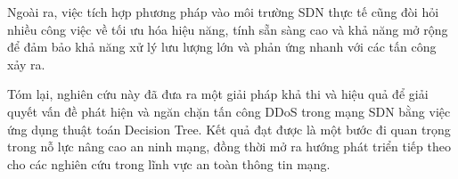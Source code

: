\documentclass[a4paper]{article}
\begin{document}
Ngoài ra, việc tích hợp phương pháp vào môi trường SDN thực tế cũng đòi hỏi nhiều công việc về tối ưu hóa hiệu năng, tính sẵn sàng cao và khả năng mở rộng để đảm bảo khả năng xử lý lưu lượng lớn và phản ứng nhanh với các tấn công xảy ra.

Tóm lại, nghiên cứu này đã đưa ra một giải pháp khả thi và hiệu quả để giải quyết vấn đề phát hiện và ngăn chặn tấn công DDoS trong mạng SDN bằng việc ứng dụng thuật toán Decision Tree. Kết quả đạt được là một bước đi quan trọng trong nỗ lực nâng cao an ninh mạng, đồng thời mở ra hướng phát triển tiếp theo cho các nghiên cứu trong lĩnh vực an toàn thông tin mạng.

\newpage
\renewcommand*{\bibfont}{\small}
\printbibliography
\end{document}
